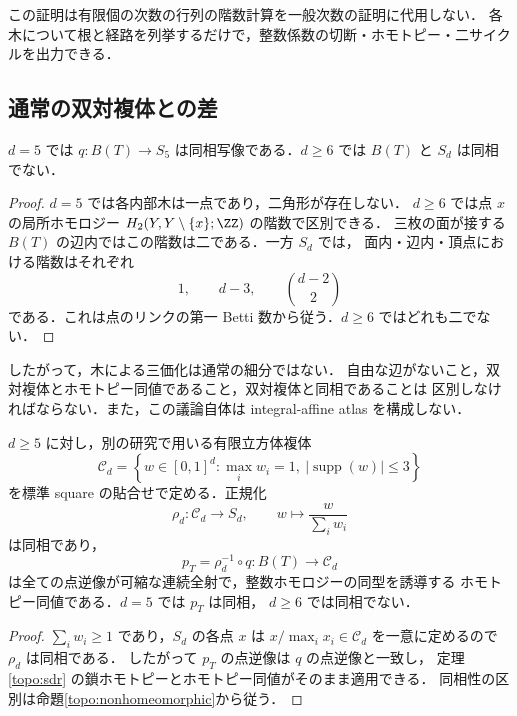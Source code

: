 この証明は有限個の次数の行列の階数計算を一般次数の証明に代用しない．
各木について根と経路を列挙するだけで，整数係数の切断・ホモトピー・二サイクルを出力できる．

\subsection{通常の双対複体との差}

\begin{proposition}\label{topo:nonhomeomorphic}
$d=5$ では $q:B(T)\to S_5$ は同相写像である．$d\geq6$ では
$B(T)$ と $S_d$ は同相でない．
\end{proposition}

\begin{proof}
$d=5$ では各内部木は一点であり，二角形が存在しない．
$d\geq6$ では点 $x$ の局所ホモロジー
$H_2(Y,Y\setminus\{x\};\ZZ)$ の階数で区別できる．
三枚の面が接する $B(T)$ の辺内ではこの階数は二である．一方 $S_d$ では，
面内・辺内・頂点における階数はそれぞれ
\[
 1,\qquad d-3,\qquad \binom{d-2}{2}
\]
である．これは点のリンクの第一 Betti 数から従う．$d\geq6$ ではどれも二でない．
\end{proof}

したがって，木による三価化は通常の細分ではない．
自由な辺がないこと，双対複体とホモトピー同値であること，双対複体と同相であることは
区別しなければならない．また，この議論自体は integral-affine atlas を構成しない．

\begin{corollary}
\label{topo:KE-cubical-comparison}
$d\ge5$ に対し，別の研究で用いる有限立方体複体
\[
 \mathcal C_d=
 \left\{w\in[0,1]^d:\max_i w_i=1,\ 
             |\operatorname{supp}(w)|\le3\right\}
\]
を標準 square の貼合せで定める．正規化
\[
 \rho_d:\mathcal C_d\longrightarrow S_d,\qquad
 w\longmapsto\frac{w}{\sum_iw_i}
\]
は同相であり，
\[
 p_T=\rho_d^{-1}\circ q:B(T)\longrightarrow\mathcal C_d
\]
は全ての点逆像が可縮な連続全射で，整数ホモロジーの同型を誘導する
ホモトピー同値である．$d=5$ では $p_T$ は同相，
$d\ge6$ では同相でない．
\end{corollary}
\begin{proof}
$\sum_iw_i\ge1$ であり，$S_d$ の各点 $x$ は
$x/\max_i x_i\in\mathcal C_d$ を一意に定めるので $\rho_d$ は同相である．
したがって $p_T$ の点逆像は $q$ の点逆像と一致し，
定理\ref{topo:sdr} の鎖ホモトピーとホモトピー同値がそのまま適用できる．
同相性の区別は命題\ref{topo:nonhomeomorphic}から従う．
\end{proof}

